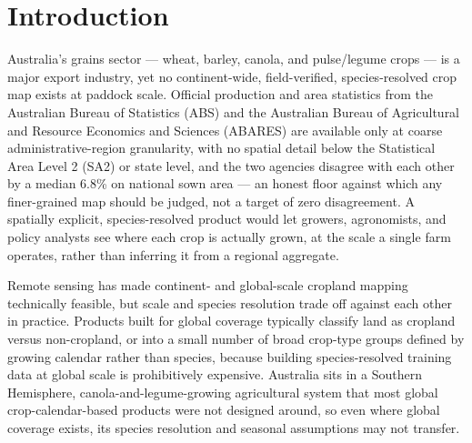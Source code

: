
\section{Introduction}\label{introduction}

Australia's grains sector --- wheat, barley, canola, and pulse/legume crops --- is a major export industry, yet no continent-wide, field-verified, species-resolved crop map exists at paddock scale. Official production and area statistics from the Australian Bureau of Statistics (ABS) and the Australian Bureau of Agricultural and Resource Economics and Sciences (ABARES) are available only at coarse administrative-region granularity, with no spatial detail below the Statistical Area Level 2 (SA2) or state level, and the two agencies disagree with each other by a median 6.8\% on national sown area --- an honest floor against which any finer-grained map should be judged, not a target of zero disagreement. A spatially explicit, species-resolved product would let growers, agronomists, and policy analysts see where each crop is actually grown, at the scale a single farm operates, rather than inferring it from a regional aggregate.

Remote sensing has made continent- and global-scale cropland mapping technically feasible, but scale and species resolution trade off against each other in practice. Products built for global coverage typically classify land as cropland versus non-cropland, or into a small number of broad crop-type groups defined by growing calendar rather than species, because building species-resolved training data at global scale is prohibitively expensive. Australia sits in a Southern Hemisphere, canola-and-legume-growing agricultural system that most global crop-calendar-based products were not designed around, so even where global coverage exists, its species resolution and seasonal assumptions may not transfer.

